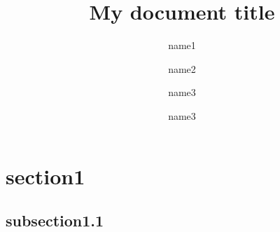 \documentclass{llncs}
\begin{document}
\title{My document title}
\author{name1 \and name2 \and name3 \and name3}
\maketitle

\begin{abstract}
\end{abstract}

\section{section1}
\subsection{subsection1.1}



\end{document}
